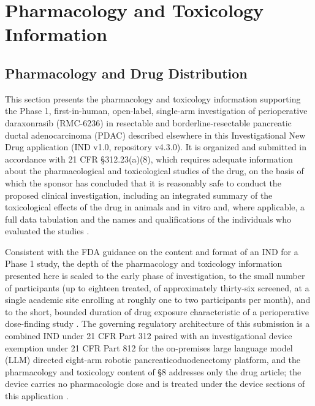 \section{Pharmacology and Toxicology Information}

\subsection{Pharmacology and Drug Distribution}

This section presents the pharmacology and toxicology information supporting the
Phase 1, first-in-human, open-label, single-arm investigation of perioperative
daraxonrasib (RMC-6236) in resectable and borderline-resectable pancreatic
ductal adenocarcinoma (PDAC) described elsewhere in this Investigational New
Drug application (IND v1.0, repository v4.3.0). It is organized and submitted in
accordance with 21 CFR \S 312.23(a)(8), which requires adequate information
about the pharmacological and toxicological studies of the drug, on the basis of
which the sponsor has concluded that it is reasonably safe to conduct the
proposed clinical investigation, including an integrated summary of the
toxicological effects of the drug in animals and in vitro and, where applicable,
a full data tabulation and the names and qualifications of the individuals who
evaluated the studies \cite{phase1guidance}. 

Consistent with the FDA guidance on
the content and format of an IND for a Phase 1 study, the depth of the
pharmacology and toxicology information presented here is scaled to the early
phase of investigation, to the small number of participants (up to eighteen
treated, of approximately thirty-six screened, at a single academic site
enrolling at roughly one to two participants per month), and to the short,
bounded duration of drug exposure characteristic of a perioperative dose-finding
study \cite{phase1guidance}. The governing regulatory architecture of this
submission is a combined IND under 21 CFR Part 312 paired with an investigational
device exemption under 21 CFR Part 812 for the on-premises large language model
(LLM) directed eight-arm robotic pancreaticoduodenectomy platform, and the
pharmacology and toxicology content of \S 8 addresses only the drug article;
the device carries no pharmacologic dose and is treated under the device sections
of this application \cite{daraxwhipple,onpremwhippl}.

